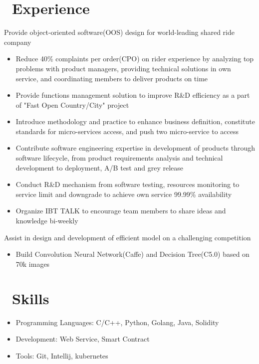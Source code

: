 \documentclass{resume}
\begin{document}
\section{\faUsers\ Experience}
Provide object-oriented software(OOS) design for world-leading shared ride company
\begin{itemize}
  \item Reduce 40\% complaints per order(CPO) on rider experience by analyzing top problems with product managers, providing technical solutions in own service, and coordinating members to deliver products on time
  \item Provide functions management solution to improve R\&D efficiency as a part of "Fast Open Country/City" project
  \item Introduce methodology and practice to enhance business definition, constitute standards for micro-services access, and push two micro-service to access
  \item Contribute software engineering expertise in development of products through software lifecycle, from product requirements analysis and technical development to deployment, A/B test and grey release
  \item Conduct R\&D mechanism from software testing, resources monitoring to service limit and downgrade to achieve own service 99.99\% availability
  \item Organize IBT TALK to encourage team members to share ideas and knowledge bi-weekly
\end{itemize}


Assist in design and development of efficient model on a challenging competition
\begin{itemize}
  \item Build Convolution Neural Network(Caffe) and Decision Tree(C5.0) based on 70k images
\end{itemize}


\section{\faCogs\ Skills}
\begin{itemize}[parsep=0.5ex]
  \item Programming Languages: C/C++, Python, Golang, Java, Solidity
  \item Development: Web Service, Smart Contract
  \item Tools: Git, Intellij, kubernetes
\end{itemize}
\end{document}
